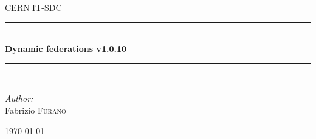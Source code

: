 \documentclass[12pt]{article} %
\begin{document}

\begin{titlepage}

\newcommand{\HRule}{\rule{\linewidth}{0.5mm}} %

\center %

\textsc{\LARGE CERN IT-SDC}\\[1.5cm] %

\HRule \\[0.4cm]
{ \huge \bfseries Dynamic federations v1.0.10}\\[0.4cm] %
\HRule \\[1.5cm]

\begin{minipage}{0.4\textwidth}
\begin{flushleft} \large
\emph{Author:}\\
Fabrizio \textsc{Furano} \\ %
\end{flushleft}
\end{minipage}

{\large \today}\\[3cm] %




\vfill %

\end{titlepage}
\end{document}
